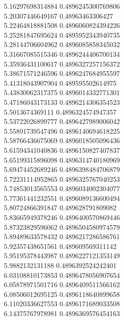 {5.16297698314884 0.4896245300769806
 \\
5.20307446649167 0.48963463306427
 \\
5.22464818881508 0.4896060824394226
 \\
5.25281847695624 0.4895952343940735
 \\
5.28144706604962 0.4896085858345032
 \\
5.31667085515346 0.4896244406700134
 \\
5.35936431100617 0.4896327257156372
 \\
5.38671571246596 0.4896247684955597
 \\
5.41318043907904 0.489595502614975
 \\
5.43830062317375 0.4896014332771301
 \\
5.47186043173133 0.4896214306354523
 \\
5.5013674369111 0.4896324574947357
 \\
5.53722026899777 0.4896427989006042
 \\
5.55891739547496 0.4896140694618225
 \\
5.58766436675069 0.4896018505096436
 \\
5.61594341040836 0.4896150827407837
 \\
5.65199315896098 0.4896314740180969
 \\
5.69474452689246 0.4896398484706879
 \\
5.72231114952865 0.4896325767040253
 \\
5.74853013565553 0.4896034002304077
 \\
5.77361441232551 0.4896089136600494
 \\
5.80724866391847 0.489628791809082
 \\
5.83665949378246 0.4896400570869446
 \\
5.87323829596062 0.4896504580974579
 \\
5.89489633578432 0.4896217286586761
 \\
5.92357438651561 0.489609569311142
 \\
5.95195378443987 0.4896227121353149
 \\
5.9882132131188 0.4896392524242401
 \\
6.03108810173853 0.4896478056907654
 \\
6.05878971501716 0.4896409511566162
 \\
6.08506012695125 0.4896118640899658
 \\
6.11020336627553 0.4896171689033508
 \\
6.14375767978981 0.4896369576454163
 \\
}
